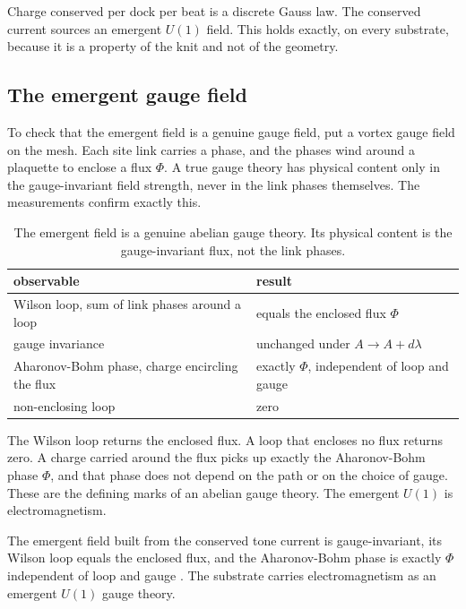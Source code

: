 \begin{principle}
Charge conserved per dock per beat is a discrete Gauss law. The conserved current sources an emergent $U(1)$ field. This holds exactly, on every substrate, because it is a property of the knit and not of the geometry.
\end{principle}

\subsection{The emergent gauge field}

To check that the emergent field is a genuine gauge field, put a vortex gauge field on the mesh. Each site link carries a phase, and the phases wind around a plaquette to enclose a flux $\Phi$. A true gauge theory has physical content only in the gauge-invariant field strength, never in the link phases themselves. The measurements confirm exactly this.

\begin{table}[ht]
\centering
\begin{tabular}{@{}ll@{}}
\toprule
observable & result \\
\midrule
Wilson loop, sum of link phases around a loop & equals the enclosed flux $\Phi$ \\
gauge invariance & unchanged under $A \to A + d\lambda$ \\
Aharonov-Bohm phase, charge encircling the flux & exactly $\Phi$, independent of loop and gauge \\
non-enclosing loop & zero \\
\bottomrule
\end{tabular}
\caption{The emergent field is a genuine abelian gauge theory. Its physical content is the gauge-invariant flux, not the link phases.}
\label{tab:gauge-observables}
\end{table}

The Wilson loop returns the enclosed flux. A loop that encloses no flux returns zero. A charge carried around the flux picks up exactly the Aharonov-Bohm phase $\Phi$, and that phase does not depend on the path or on the choice of gauge. These are the defining marks of an abelian gauge theory. The emergent $U(1)$ is electromagnetism.

\begin{result}
The emergent field built from the conserved tone current is gauge-invariant, its Wilson loop equals the enclosed flux, and the Aharonov-Bohm phase is exactly $\Phi$ independent of loop and gauge \cite{pollard2026vibetest}. The substrate carries electromagnetism as an emergent $U(1)$ gauge theory.
\end{result}

